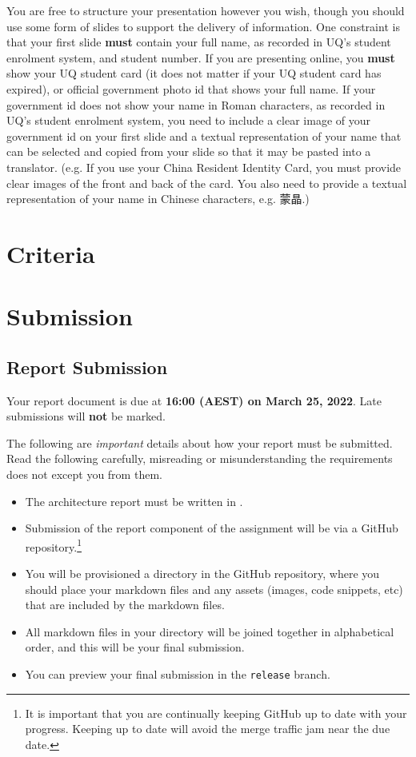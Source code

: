 \documentclass{csse4400}
\begin{document}
\begin{CJK*}{UTF8}{gbsn}
You are free to structure your presentation however you wish, though you should use some form of slides to support the delivery of information.
One constraint is that your first slide \textbf{must} contain your full name, as recorded in UQ's student enrolment system, and student number.
If you are presenting online, you \textbf{must} show your UQ student card (it does not matter if your UQ student card has expired),
or official government photo id that shows your full name. If your government id does not show your name in Roman characters,
as recorded in UQ's student enrolment system, you need to include a clear image of your government id on your first slide and a textual
representation of your name that can be selected and copied from your slide so that it may be pasted into a translator.
(e.g. If you use your China Resident Identity Card, you must provide clear images of the front and back
of the card. You also need to provide a textual representation of your name in Chinese characters, e.g. 蒙晶.)
\end{CJK*}

\section{Criteria}

\section{Submission}
\subsection{Report Submission}
Your report document is due at \textbf{16:00 (AEST) on March 25, 2022}. Late submissions will \textbf{not} be marked.

The following are \textsl{important} details about how your report must be submitted.
Read the following carefully, misreading or misunderstanding the requirements does not except you from them.

\begin{itemize}
    \item The architecture report must be written in .
    \item Submission of the report component of the assignment will be via a GitHub repository.\footnote{It is important that you are continually keeping GitHub up to date with your progress.
        Keeping up to date will avoid the merge traffic jam near the due date.}
    \item You will be provisioned a directory in the GitHub repository,
        where you should place your markdown files and any assets (images, code snippets, etc) that are included by the markdown files.
    \item All markdown files in your directory will be joined together in alphabetical order,
        and this will be your final submission.
    \item You can preview your final submission in the \texttt{release} branch.
\end{itemize}
\end{document}
